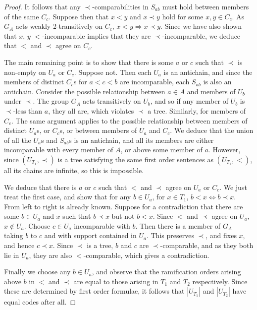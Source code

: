 \documentclass[10pt,a4paper]{amsart}
\begin{document}
\begin{proof}
It follows that any $\prec$-comparabilities in $S_{ab}$ must hold between members of the same $C_c$. Suppose then that
$x < y$ and $x \prec y$ hold for some $x, y \in C_c$. As $G_A$ acts weakly 2-transitively on $C_c$, $x < y \Rightarrow x \prec y$. 
Since we have also shown that $x$, $y$ $<$-incomparable implies that they are $\prec$-incomparable, we deduce that $<$ and $\prec$
agree on $C_c$. 

The main remaining point is to show that there is some $a$ or $c$ such that $\prec$ is non-empty on $U_a$ or $C_c$. Suppose not. Then
each $U_a$ is an antichain, and since the members of distinct $C_c$s for $a < c < b$ are incomparable, each $S_{ab}$ is also an
antichain. Consider the possible relationship between $a \in A$ and members of $U_b$ under $\prec$. The group $G_A$ acts transitively 
on $U_b$, and so if any member of $U_b$ is $\prec$-less than $a$, they all are, which violates $\prec$ a tree. Similarly, for members
of $C_c$. The same argument applies to the possible relationship between members of distinct $U_a$s, or $C_c$s, or between members 
of $U_a$ and $C_c$. We deduce that the union of all the $U_a$s and $S_{ab}$s is an antichain, and all its members are either 
incomparable with every member of $A$, or above some member of $a$. However, since $(U_{T_1}, \prec)$ is a tree satisfying the
same first order sentences as $(U_{T_1}, <)$, all its chains are infinite, so this is impossible.

We deduce that there is $a$ or $c$ such that $<$ and $\prec$ agree on $U_a$ or $C_c$. We just treat the first case, and show that 
for any $b \in U_a$, for $x \in T_1$, $b < x \Leftrightarrow b \prec x$. From left to right is already known. Suppose for a 
contradiction that there are some $b \in U_a$ and $x$ such that $b \prec x$ but not $b < x$. Since $<$ and $\prec$ agree on $U_a$, 
$x \not \in U_a$. Choose $c \in U_a$ incomparable with $b$. Then there is a member of $G_A$ taking $b$ to $c$ and with support 
contained in $U_a$. This preserves $\prec$, and fixes $x$, and hence $c \prec x$. Since $\prec$ is a tree, $b$ and $c$ are 
$\prec$-comparable, and as they both lie in $U_a$, they are also $<$-comparable, which gives a contradiction.

Finally we choose any $b \in U_a$, and observe that the ramification orders arising above $b$ in $<$ and $\prec$ are equal to those
arising in $T_1$ and $T_2$ respectively. Since these are determined by first order formulae, it follows that $|U_{T_1}|$ and $|U_{T_2}|$ 
have equal codes after all.  \end{proof}
\end{document}
